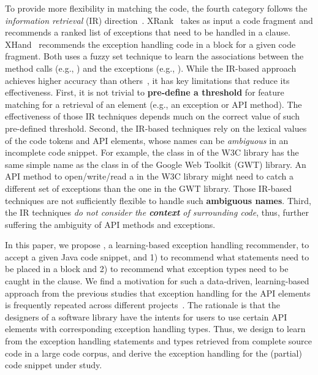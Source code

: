 To provide more flexibility in matching the code, the fourth category
follows the {\em information retrieval} (IR)
direction~\cite{xrank-fse20}. XRank~\cite{xrank-fse20} takes as input
a code fragment and recommends a ranked list of exceptions that need
to be handled in a  clause. XHand~\cite{xrank-fse20}
recommends the exception handling code in a  block for a
given code fragment. Both uses a fuzzy set technique to learn the
associations between the method calls (e.g.,
) and the exceptions (e.g.,
). While the IR-based approach achieves higher
accuracy than others~\cite{xrank-fse20}, it has key limitations that
reduce its effectiveness. First, it is not trivial to {\bf
  pre-define a threshold} for feature matching for a retrieval of an
element (e.g., an exception or API method). The effectiveness of those
IR techniques depends much on the correct value of such pre-defined
threshold. Second, the IR-based techniques rely on the lexical values
of the code tokens and API elements, whose names can be {\em
  ambiguous} in an incomplete code snippet. For example, the
 class in  of the W3C library has
the same simple name as the  class in
 of the Google Web
Toolkit (GWT) library. An API method to open/write/read a
 in the W3C library might need to catch a different set
of exceptions than the one in the GWT library. Those IR-based
techniques are not sufficiently flexible to handle such {\bf ambiguous
  names}. Third, the IR techniques {\em do not consider the {\bf
    context} of surrounding code}, thus, further suffering the
ambiguity of API methods and exceptions.

In this paper, we propose {\tool}, a learning-based exception handling
recommender, to accept a given Java code snippet, and 1) to recommend
what statements need to be placed in a  block and 2)
to recommend what exception types need to be caught in the
 clause.  We find a motivation for such a data-driven,
learning-based approach from the previous studies that exception
handling for the API elements is frequently repeated across different
projects~\cite{chanchal-scam14,zhong-jss18}. The rationale is that the
designers of a software library have the intents for users to use
certain API elements with corresponding exception handling types.
Thus, we design {\tool} to learn from the exception handling
statements and types retrieved from complete source code in a large
code corpus, and derive the exception handling for the (partial) code
snippet under study.


